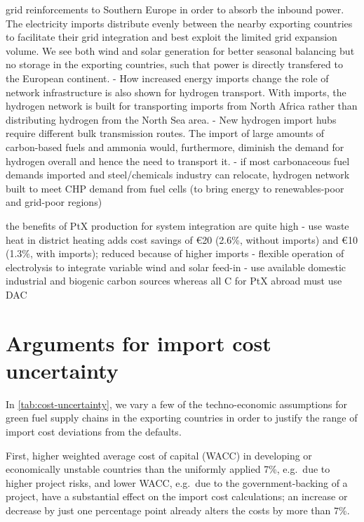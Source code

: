 grid reinforcements to Southern Europe in order to absorb the inbound power. The
electricity imports distribute evenly between the nearby exporting countries to
facilitate their grid integration and best exploit the limited grid expansion
volume. We see both wind and solar generation for better seasonal balancing but
no storage in the exporting countries, such that power is directly transfered to
the European continent.
- How increased energy imports change the role of network
infrastructure is also shown for hydrogen transport. With imports, the hydrogen
network is built for transporting imports from North Africa rather than
distributing hydrogen from the North Sea area.
- New hydrogen
import hubs require different bulk transmission routes. The import of large
amounts of carbon-based fuels and ammonia would, furthermore, diminish the
demand for hydrogen overall and hence the need to transport it.
- if most carbonaceous fuel demands imported and steel/chemicals industry can
relocate, hydrogen network built to meet CHP demand from fuel cells (to bring
energy to renewables-poor and grid-poor regions)

the benefits of PtX production for system integration are quite high
- use waste heat in district heating adds cost savings of \euro{20} (2.6\%, without imports) and \euro{10} (1.3\%, with imports); reduced because of higher imports
- flexible operation of electrolysis to integrate variable wind and solar feed-in
- use available domestic industrial and biogenic carbon sources whereas all C for PtX abroad must use DAC

\section*{Arguments for import cost uncertainty}

In \cref{tab:cost-uncertainty}, we vary a few of the techno-economic assumptions
for green fuel supply chains in the exporting countries in order to justify the
range of import cost deviations from the defaults.

First, higher weighted average cost of capital (WACC) in developing or
economically unstable countries than the uniformly applied 7\%, e.g.~due to
higher project risks, and lower WACC, e.g.~due to the government-backing of a
project, have a substantial effect on the import cost calculations; an increase
or decrease by just one percentage point already alters the costs by more than
7\%.\cite{egliBiasEnergy2019,bogdanovReplyBias2019,lonerganImprovingRepresentation2023a,schyskaHowRegional2020,steffenDeterminantsCost2022}

